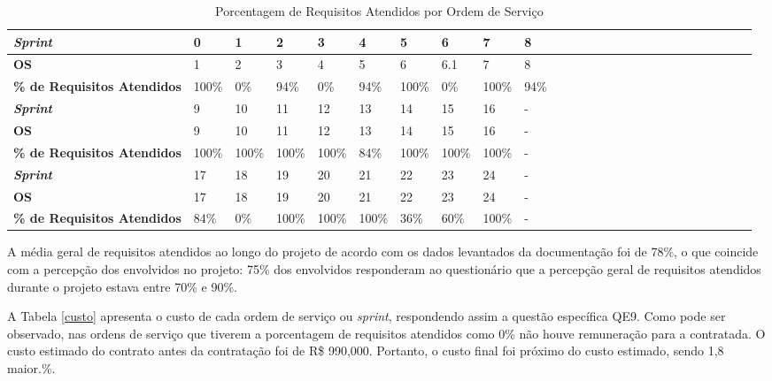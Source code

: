 \begin{table}[h]
\footnotesize
\center
\begin{tabular}{|l|l|l|l|l|l|l|l|l|l|l|l|l|l|l|l|l|l|l|l|l|l|l|l|l|l|}
\hline
\textbf{\textit{Sprint}} & 0   & 1 &  2 & 3 & 4 & 5 & 6 & 7 & 8  \\ \hline
\textbf{OS} & 1 &  2 & 3 & 4 & 5 & 6 & 6.1 & 7 & 8  \\ \hline
\textbf{\% de Requisitos Atendidos} & 100\% &  0\%    & 94\%    & 0\%    & 94\%         & 100\%        & 0\%       & 100\%                                                                                     & 94\%               \\ \hline \hline
\textbf{\textit{Sprint}} &  9 & 10 & 11 & 12 & 13 & 14 & 15 & 16  & -\\ \hline
\textbf{OS} &  9 & 10 & 11 & 12 & 13 & 14 & 15 & 16 & - \\ \hline
\textbf{\% de Requisitos Atendidos} &   100\%                                       & 100\%           & 100\%  & 100\% & 84\%         & 100\%         & 100\%       & 100\%  &-         \\ \hline \hline
\textbf{\textit{Sprint}} &  17 & 18 & 19 & 20 & 21 & 22 & 23 & 24  & -\\ \hline
\textbf{OS} &  17 & 18 & 19 & 20 & 21 & 22 & 23 & 24 & - \\ \hline
\textbf{\% de Requisitos Atendidos} &  84\%        & 0\%        & 100\%          & 100\% & 100\%     & 36\%      & 60\%        & 100\%          &-                                                                          \\ \hline

\end{tabular}
\caption{Porcentagem de Requisitos Atendidos por Ordem de Serviço}
		\label{porcentagemrequisitos}
\end{table}

 A média geral de requisitos atendidos ao longo do projeto de acordo com os dados levantados da documentação foi de 78\%, o que coincide com a percepção dos envolvidos no projeto: 75\% dos envolvidos responderam ao questionário que a percepção geral de requisitos atendidos durante o projeto estava entre 70\% e 90\%.

A Tabela \ref{custo} apresenta o custo de cada ordem de serviço ou \textit{sprint}, respondendo assim a questão específica QE9. Como pode ser observado, nas ordens de serviço que tiverem a porcentagem de requisitos atendidos como 0\% não houve remuneração para a contratada. O custo estimado do contrato antes da contratação foi de R\$ 990,000. Portanto, o custo final foi próximo do custo estimado, sendo 1,8 maior.\%.

